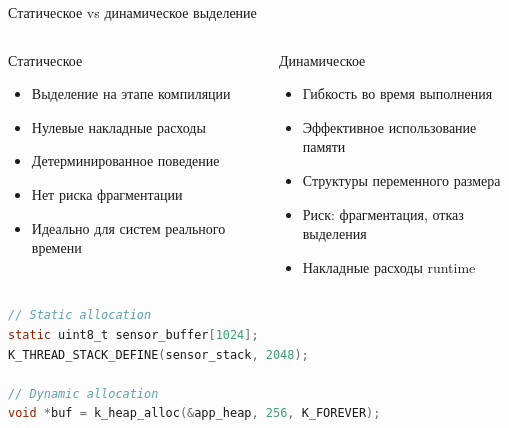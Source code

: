 \documentclass[12pt,aspectratio=169]{beamer}
\begin{document}
\begin{frame}[fragile]{Статическое vs динамическое выделение}
\begin{columns}
\begin{block}{Статическое}
\begin{itemize}
  \item Выделение на этапе компиляции
  \item Нулевые накладные расходы
  \item Детерминированное поведение
  \item Нет риска фрагментации
  \item Идеально для систем реального времени
\end{itemize}
\end{block}
\begin{block}{Динамическое}
\begin{itemize}
  \item Гибкость во время выполнения
  \item Эффективное использование памяти
  \item Структуры переменного размера
  \item Риск: фрагментация, отказ выделения
  \item Накладные расходы runtime
\end{itemize}
\end{block}
\end{columns}

\vspace{6pt}
\begin{lstlisting}[language=C, basicstyle=\ttfamily\scriptsize]
// Static allocation
static uint8_t sensor_buffer[1024];
K_THREAD_STACK_DEFINE(sensor_stack, 2048);

// Dynamic allocation
void *buf = k_heap_alloc(&app_heap, 256, K_FOREVER);
\end{lstlisting}
\end{frame}

\end{document}

